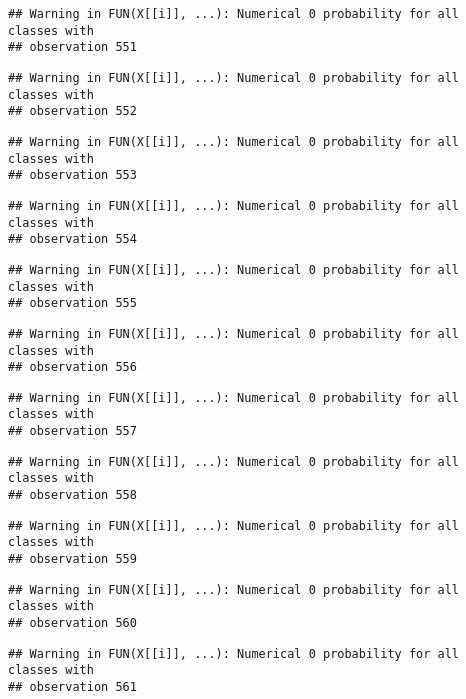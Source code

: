 \documentclass[
]{article}
\begin{document}
\begin{verbatim}
## Warning in FUN(X[[i]], ...): Numerical 0 probability for all classes with
## observation 551
\end{verbatim}

\begin{verbatim}
## Warning in FUN(X[[i]], ...): Numerical 0 probability for all classes with
## observation 552
\end{verbatim}

\begin{verbatim}
## Warning in FUN(X[[i]], ...): Numerical 0 probability for all classes with
## observation 553
\end{verbatim}

\begin{verbatim}
## Warning in FUN(X[[i]], ...): Numerical 0 probability for all classes with
## observation 554
\end{verbatim}

\begin{verbatim}
## Warning in FUN(X[[i]], ...): Numerical 0 probability for all classes with
## observation 555
\end{verbatim}

\begin{verbatim}
## Warning in FUN(X[[i]], ...): Numerical 0 probability for all classes with
## observation 556
\end{verbatim}

\begin{verbatim}
## Warning in FUN(X[[i]], ...): Numerical 0 probability for all classes with
## observation 557
\end{verbatim}

\begin{verbatim}
## Warning in FUN(X[[i]], ...): Numerical 0 probability for all classes with
## observation 558
\end{verbatim}

\begin{verbatim}
## Warning in FUN(X[[i]], ...): Numerical 0 probability for all classes with
## observation 559
\end{verbatim}

\begin{verbatim}
## Warning in FUN(X[[i]], ...): Numerical 0 probability for all classes with
## observation 560
\end{verbatim}

\begin{verbatim}
## Warning in FUN(X[[i]], ...): Numerical 0 probability for all classes with
## observation 561
\end{verbatim}
\end{document}
